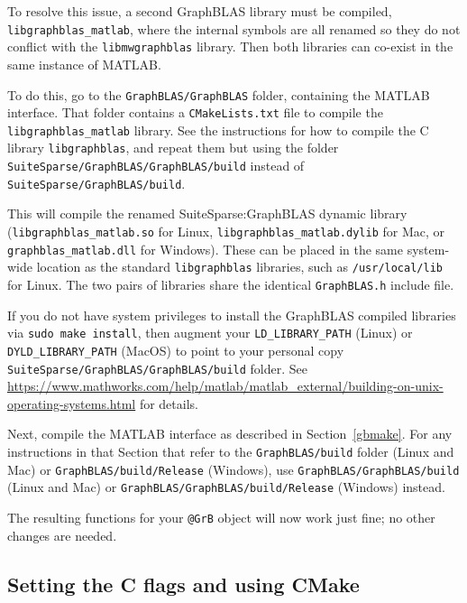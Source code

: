 \documentclass[12pt]{article}
\begin{document}
To resolve this issue, a second GraphBLAS library must be compiled,
\verb'libgraphblas_matlab', where the internal symbols are all renamed so they
do not conflict with the \verb'libmwgraphblas' library.  Then both libraries
can co-exist in the same instance of MATLAB.

To do this, go to the \verb'GraphBLAS/GraphBLAS' folder, containing the
MATLAB interface.  That folder contains a \verb'CMakeLists.txt' file to
compile the \verb'libgraphblas_matlab' library.  See the instructions
for how to compile the C library \verb'libgraphblas', and repeat them but
using the folder \newline
\verb'SuiteSparse/GraphBLAS/GraphBLAS/build' instead of \newline
\verb'SuiteSparse/GraphBLAS/build'.

This will compile the renamed SuiteSparse:GraphBLAS dynamic library
(\verb'libgraphblas_matlab.so' for Linux, \verb'libgraphblas_matlab.dylib'
for Mac, or \verb'graphblas_matlab.dll' for Windows).  These can be
placed in the same system-wide location as the standard \verb'libgraphblas'
libraries, such as \verb'/usr/local/lib' for Linux.  The two pairs of
libraries share the identical \verb'GraphBLAS.h' include file.

If you do not have system privileges to install the GraphBLAS compiled
libraries via \verb'sudo make install', then augment your
\verb'LD_LIBRARY_PATH' (Linux) or \verb'DYLD_LIBRARY_PATH' (MacOS) to point to
your personal copy \verb'SuiteSparse/GraphBLAS/GraphBLAS/build' folder.  See
\url{https://www.mathworks.com/help/matlab/matlab_external/building-on-unix-operating-systems.html}
for details. 

Next, compile the MATLAB interface as described in Section~\ref{gbmake}.  For
any instructions in that Section that refer to the \verb'GraphBLAS/build'
folder (Linux and Mac) or \verb'GraphBLAS/build/Release' (Windows), use \newline
\verb'GraphBLAS/GraphBLAS/build' (Linux and Mac) or \newline
\verb'GraphBLAS/GraphBLAS/build/Release' (Windows) instead.

The resulting functions for your \verb'@GrB' object will now work just fine;
no other changes are needed.

\subsection{Setting the C flags and using CMake}
\end{document}
